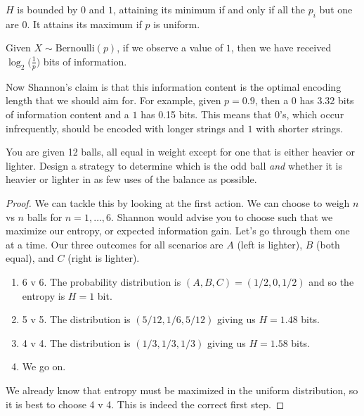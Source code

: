 \documentclass{article}
\begin{document}
    \begin{theorem}
      $H$ is bounded by $0$ and $1$, attaining its minimum if and only if all the $p_i$ but one are $0$. It attains its maximum if $p$ is uniform. 
    \end{theorem}

    \begin{example}[Bits]
      Given $X \sim \mathrm{Bernoulli}(p)$, if we observe a value of $1$, then we have received $\log_2 \big( \frac{1}{p} \big)$ bits of information. 
    \end{example}

    Now Shannon's claim is that this information content is the optimal encoding length that we should aim for. For example, given $p = 0.9$, then a $0$ has 3.32 bits of information content and a $1$ has 0.15 bits. This means that $0$'s, which occur infrequently, should be encoded with longer strings and $1$ with shorter strings.   

    \begin{exercise}
      You are given 12 balls, all equal in weight except for one that is either heavier or lighter. Design a strategy to determine which is the odd ball \textit{and} whether it is heavier or lighter in as few uses of the balance as possible. 
    \end{exercise}

    \begin{proof}
      We can tackle this by looking at the first action. We can choose to weigh $n$ vs $n$ balls for $n = 1, \ldots, 6$. Shannon would advise you to choose such that we maximize our entropy, or expected information gain. Let's go through them one at a time. Our three outcomes for all scenarios are $A$ (left is lighter), $B$ (both equal), and $C$ (right is lighter). 
      \begin{enumerate}
        \item 6 v 6. The probability distribution is $(A, B, C) = (1/2, 0, 1/2)$ and so the entropy is $H = 1$ bit. 
        \item 5 v 5. The distribution is $(5/12, 1/6, 5/12)$ giving us $H = 1.48$ bits. 
        \item 4 v 4. The distribution is $(1/3, 1/3, 1/3)$ giving us $H = 1.58$ bits. 
        \item We go on. 
      \end{enumerate}
      We already know that entropy must be maximized in the uniform distribution, so it is best to choose 4 v 4. This is indeed the correct first step. 
      
    \end{proof}
\end{document}
